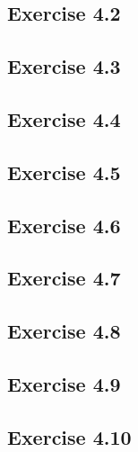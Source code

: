 \documentclass[11pt]{article}
\theoremstyle{definition}
\theoremstyle{remark}
\begin{document}
\subsection{Exercise 4.2}

\subsection{Exercise 4.3}

\subsection{Exercise 4.4}

\subsection{Exercise 4.5}

\subsection{Exercise 4.6}

\subsection{Exercise 4.7}

\subsection{Exercise 4.8}

\subsection{Exercise 4.9}

\subsection{Exercise 4.10}

\end{document}
